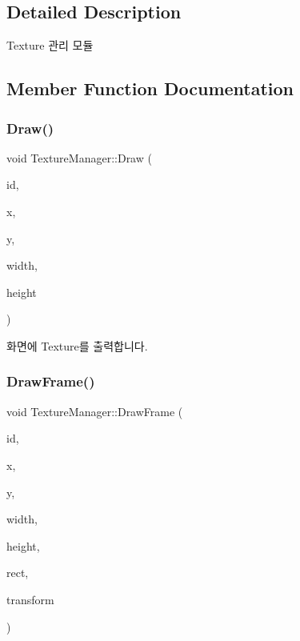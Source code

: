 \subsection{Detailed Description}
Texture 관리 모듈 

\subsection{Member Function Documentation}
\mbox{\label{class_texture_manager_ad2d52c0673d95a8958c0800b895279f2}} 
\subsubsection{\texorpdfstring{Draw()}{Draw()}}
{\footnotesize\ttfamily void Texture\+Manager\+::\+Draw (\begin{DoxyParamCaption}\item[{std\+::string}]{id,  }\item[{int}]{x,  }\item[{int}]{y,  }\item[{int}]{width,  }\item[{int}]{height }\end{DoxyParamCaption})}

화면에 Texture를 출력합니다. \mbox{\label{class_texture_manager_a153f1fdbc4f953470c289a31058fcfd7}} 
\subsubsection{\texorpdfstring{DrawFrame()}{DrawFrame()}}
{\footnotesize\ttfamily void Texture\+Manager\+::\+Draw\+Frame (\begin{DoxyParamCaption}\item[{std\+::string}]{id,  }\item[{int}]{x,  }\item[{int}]{y,  }\item[{int}]{width,  }\item[{int}]{height,  }\item[{R\+E\+CT \&}]{rect,  }\item[{Transform\+Data \&}]{transform }\end{DoxyParamCaption})}

